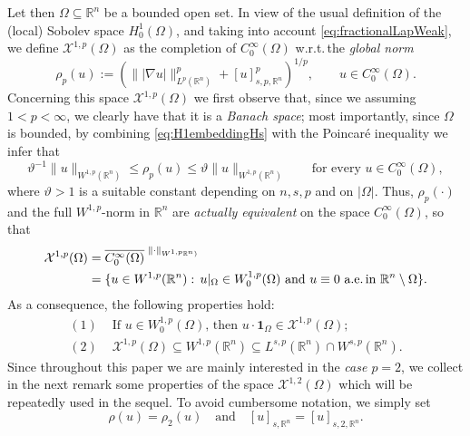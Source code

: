 \documentclass[11pt,a4paper]{amsart}
\def \R {\mathbb{R}}
\theoremstyle{definition}
\theoremstyle{plain}
\numberwithin{equation}{section}
\begin{document}
Let then $\Omega\subseteq\R^n$ be a bounded open set.  In view of the usual definition of the (local) Sobolev space $H_0^1(\Omega)$,
  and taking into account \eqref{eq:fractionalLapWeak}, we 
  define 
  $\mathcal{X}^{1,p}(\Omega)$ as the com\-ple\-tion
  of $C_0^\infty(\Omega)$ w.r.t.\,the \emph{global norm} 
  $$\rho_p(u) := \left(\||\nabla u|\|^p_{L^p(\R^n)}+[u]^p_{s,p,\R^n}\right)^{1/p},
  \qquad u\in C_0^\infty(\Omega).$$
  Concerning this space $\mathcal{X}^{1,p}(\Omega)$ we first observe that,
  since we assuming $1<p<\infty$, we clearly have that it  is a \emph{Banach space}; most importantly, since $\Omega$ is bounded, by combining 
    \eqref{eq:H1embeddingHs} with the Poincar\'e
    inequality we infer that
    \begin{equation*}
     \vartheta^{-1}\|u\|_{W^{1,p}(\R^n)}\leq \rho_p(u)\leq \vartheta\|u\|_{W^{1,p}(\R^n)}\qquad
    \text{for every $u\in C_0^\infty(\Omega)$},
    \end{equation*}
    where $\vartheta > 1$ is a suitable constant depending on $n,s,p$ and on $|\Omega|$.
    Thus, $\rho_p(\cdot)$ and the full $W^{1,p}$-norm in $\R^n$
   are \emph{actually equivalent} on the space $C^\infty_0(\Omega)$, so that
   \begin{equation} \label{eq:defX12explicit}
   \begin{split}
    \mathcal{X}^{1,p}(\Omega) & = \overline{C_0^\infty(\Omega)}^{\,\,\|\cdot\|_{W^{1,p}\R^n)}} \\
    & = \{u\in W^{1,p}(\R^n):\,\text{$u|_\Omega\in W_0^{1,p}(\Omega)$ and 
    $u\equiv 0$ a.e.\,in $\R^n\setminus\Omega$}\}.
    \end{split}
   \end{equation}
   As a consequence, the following properties hold:
   \begin{align}
   	(1)\,\,&\text{If $u\in W_0^{1,p}(\Omega)$, then $u\cdot\mathbf{1}_\Omega\in \mathcal{X}^{1,p}(\Omega)$}; \label{eq:ExtensionW0X1p} \\
   	(2)\,\,&\mathcal{X}^{1,p}(\Omega)\subseteq W^{1,p}(\mathbb{R}^n)\subseteq
   	L^{s,p}(\mathbb{R}^n)\cap W^{s,p}(\mathbb{R}^n). \label{eq:X1pWsLps}
   \end{align}
   Since throughout this paper we are mainly interested in the \emph{case $p = 2$}, we collect in the next remark some properties of the space $\mathcal{X}^{1,2}(\Omega)$ which will be repeatedly used in the sequel.
 To avoid cumbersome notation, we simply set
 $$\rho(u) = \rho_2(u)\quad\text{and}\quad [u]_{s,\mathbb{R}^n} = [u]_{s,2,\mathbb{R}^n}.$$
\end{document}
